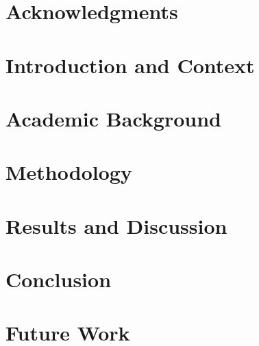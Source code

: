 \documentclass[11pt,a4paper]{report}
\begin{document}
\begin{abstract}

\end{abstract}

\chapter*{Acknowledgments}


\tableofcontents
\listoffigures
\listoftables

\newpage

\clearpage
{}

\chapter{Introduction and Context}


\chapter{Academic Background}


\chapter{Methodology}


\chapter{Results and Discussion}


\chapter{Conclusion}


\chapter{Future Work}

\newpage

\appendix

\end{document}
